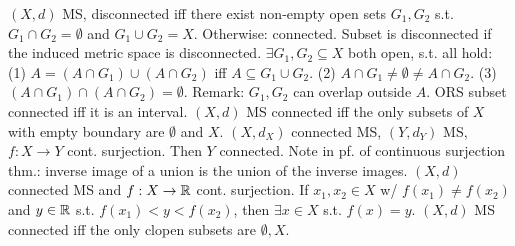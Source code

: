  $(X, d)$ MS,
disconnected iff there exist non-empty open sets $G_1, G_2$ s.t.
$G_1 \cap G_2 = \emptyset$ and $G_1 \cup G_2 = X$.
Otherwise: connected.
Subset is disconnected if the induced metric space is disconnected.
$\exists G_1, G_2 \subseteq X$ both open, s.t. all hold:
(1) $A = (A \cap G_1) \cup (A \cap G_2)$ iff $A \subseteq G_1 \cup G_2$.
(2) $A \cap G_1 \neq \emptyset \neq A \cap G_2$.
(3) $(A \cap G_1) \cap (A \cap G_2) = \emptyset$.
Remark: $G_1, G_2$ can overlap outside $A$.
 ORS subset connected iff it is an interval.
$(X,d)$ MS connected iff the only subsets of $X$ with empty boundary are
$\emptyset$ and $X$.
 $(X, d_X)$ connected MS, $(Y, d_Y)$ MS, $f: X \to Y$ cont. surjection.
Then $Y$ connected.
Note in pf. of continuous surjection thm.: inverse image of a union is the union of the inverse images.
 $(X,d)$ connected MS and $f: X \to \mathbb{R}$ cont. surjection.
If $x_1, x_2 \in X$ w/ $f(x_1) \neq f(x_2)$ and $y \in \mathbb{R}$ s.t.
$f(x_1) < y < f(x_2)$, then $\exists x \in X$ s.t. $f(x) = y$.
 $(X,d)$ MS connected iff the only clopen subsets are $\emptyset, X$.
